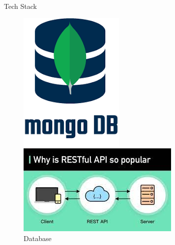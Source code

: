 \documentclass{beamer}
\begin{document}
\begin{frame}{Tech Stack}
\begin{figure}
\begin{minipage}[t]{0.2\textwidth}
            \includegraphics[width=\textwidth]{mongoDB.png}
            \caption{Database}
        \end{minipage}\hfill
        \begin{minipage}[t]{0.2\textwidth}
            \centering
            \includegraphics[width=\textwidth]{API.jpeg}

\end{minipage}
\end{figure}
\end{frame}
\end{document}

